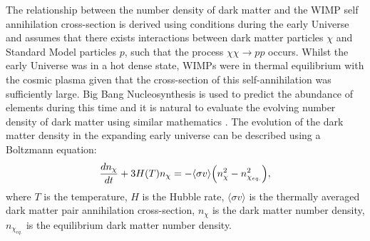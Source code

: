 The relationship between the number density of dark matter and the WIMP self annihilation cross-section is derived using conditions during the early Universe and assumes that there exists interactions between dark matter particles $\chi$ and Standard Model particles $p$, such that the process $\chi\chi\rightarrow pp$ occurs. Whilst the early Universe was in a hot dense state, WIMPs were in thermal equilibrium with the cosmic plasma given that the cross-section of this self-annihilation was sufficiently large. Big Bang Nucleosynthesis is used to predict the abundance of elements during this time and it is natural to evaluate the evolving number density of dark matter using similar mathematics \cite{Peebles:1991ch}. The evolution of the dark matter density in the expanding early universe can be described using a Boltzmann equation:
\begin{equation}\label{eqn:DMOverview/DMBoltz}
    \frac{dn_\chi}{dt}+3H(T)n_\chi=-\langle\sigma v\rangle\Bigl(n_\chi^2-n_{\chi_{eq.}}^2\Bigl),
\end{equation}
where $T$ is the temperature, $H$ is the Hubble rate, $\langle\sigma v\rangle$ is the thermally averaged dark matter pair annihilation cross-section, $n_\chi$ is the dark matter number density, $n_{\chi_{eq.}}$ is the equilibrium dark matter number density.

